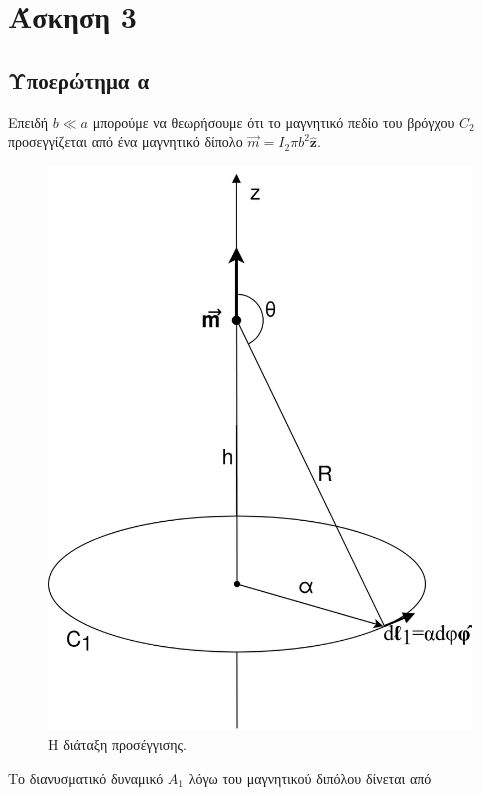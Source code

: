 \section{Άσκηση 3}

\subsection{Υποερώτημα α}

Επειδή $b \ll a$ μπορούμε να θεωρήσουμε ότι το μαγνητικό πεδίο του βρόγχου
$C_2$ προσεγγίζεται από ένα μαγνητικό δίπολο $\vec{m} = I_2\pi b^2
\hat{\mathbf{z}}$.

\begin{figure}
  \centering
  \includegraphics[scale=0.25]{figures/figure_dipole.png}
  \caption{Η διάταξη προσέγγισης.}
  \label{fig:problem-5}
\end{figure}

Το διανυσματικό δυναμικό $Α_1$ λόγω του μαγνητικού διπόλου δίνεται από 


